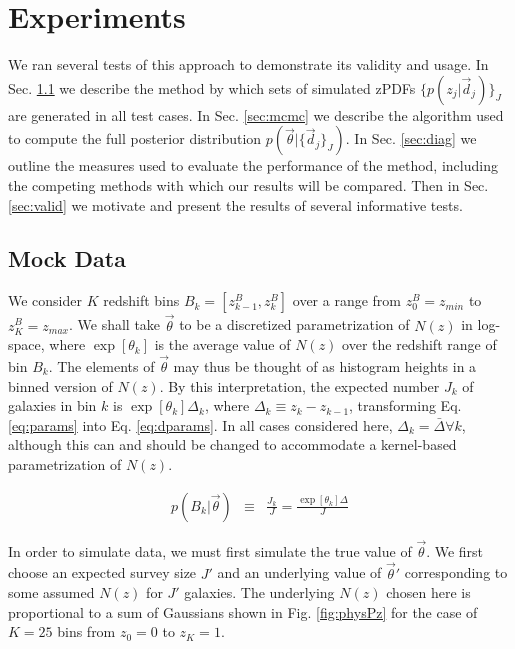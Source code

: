 \documentclass[preprint]{aastex}
\begin{document}
\section{Experiments}
\label{sec:exp}

We ran several tests of this approach to demonstrate its validity and usage.  In Sec. \ref{sec:mock} we describe the method by which sets of simulated zPDFs $\{p(z_{j}|\vec{d}_{j})\}_{J}$ are generated in all test cases.  In Sec. \ref{sec:mcmc} we describe the algorithm used to compute the full posterior distribution $p(\vec{\theta}|\{\vec{d}_{j}\}_{J})$.  In Sec. \ref{sec:diag} we outline the measures used to evaluate the performance of the method, including the competing methods with which our results will be compared.  Then in Sec. \ref{sec:valid} we motivate and present the results of several informative tests.

\subsection{Mock Data}
\label{sec:mock}

We consider $K$ redshift bins $B_{k}=[z^{B}_{k-1},z^{B}_{k}]$ over a range from $z^{B}_{0}=z_{min}$ to $z^{B}_{K}=z_{max}$.  We shall take $\vec{\theta}$ to be a discretized parametrization of $N(z)$ in log-space, where $\exp[\theta_{k}]$ is the average value of $N(z)$ over the redshift range of bin $B_{k}$.   The elements of $\vec{\theta}$ may thus be thought of as histogram heights in a binned version of $N(z)$.  By this interpretation, the expected number $J_{k}$ of galaxies in bin $k$ is $\exp[\theta_{k}]\Delta_{k}$, where $\Delta_{k}\equiv z_{k}-z_{k-1}$, transforming Eq. \ref{eq:params} into Eq. \ref{eq:dparams}.  In all cases considered here, $\Delta_{k}=\bar{\Delta}\forall k$, although this can and should be changed to accommodate a kernel-based parametrization of $N(z)$.

\begin{eqnarray}
\label{eq:dparams}
p(B_{k}|\vec{\theta}) &\equiv& \frac{J_{k}}{J} = \frac{\exp[\theta_{k}]\Delta}{J}
\end{eqnarray}

In order to simulate data, we must first simulate the true value of $\vec{\theta}$.  We first choose an expected survey size $J'$ and an underlying value of $\vec{\theta}'$ corresponding to some assumed $N(z)$ for $J'$ galaxies.  The underlying $N(z)$ chosen here is proportional to a sum of Gaussians shown in Fig. \ref{fig:physPz} for the case of $K=25$ bins from $z_{0}=0$ to $z_{K}=1$.
\end{document}
